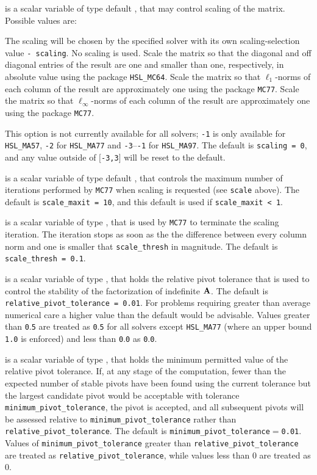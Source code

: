 \documentclass{galahad}
\begin{document}
\begin{description}
 is a scalar variable of type default \integer, that may control
scaling of the matrix.
Possible values are:
\begin{description}
 The scaling will be chosen by the specified solver with its
        own scaling-selection value {\tt - scaling}.
 No scaling is used.
 Scale the matrix so that the diagonal and off diagonal
entries of the result are one and smaller than one, respectively,
in absolute value using the package {\tt HSL\_MC64}.
 Scale the matrix so that $\ell_1$-norms of each column
of the result are approximately one using the package {\tt MC77}.
 Scale the matrix so that $\ell_{\infty}$-norms of each column
of the result are approximately one using the package {\tt MC77}.
\end{description}
This option is not currently available for all solvers; {\tt -1} is
only available for {\tt HSL\_MA57}, {\tt -2} for {\tt HSL\_MA77}
and {\tt -3}--{\tt -1} for {\tt HSL\_MA97}.
The default is {\tt scaling = 0},
and any value outside of $[${\tt -3,3}$]$ will be reset to the default.

 is a scalar variable of type default \integer,
that controls the maximum number of iterations performed
by {\tt MC77} when scaling is requested (see {\tt scale} above).
The default is {\tt scale\_maxit = 10},
and this default is used if {\tt scale\_maxit < 1}.

 is a scalar variable of type \realdp,
that is used by {\tt MC77} to terminate the scaling iteration.
The iteration stops as soon as the the difference between
every column norm and one is smaller that {\tt scale\_thresh}
in magnitude. The default is {\tt scale\_thresh = 0.1}.

 is a scalar variable of type \realdp,
that holds the relative pivot tolerance that is used to control the
stability of the factorization of indefinite ${\mathbf{A}}$.
The default is {\tt relative\_pivot\_tolerance = 0.01}.
For problems requiring greater
than average numerical care a higher value than the default would be
advisable. Values greater than {\tt 0}.{\tt 5} are treated as {\tt 0}.{\tt 5}
for all solvers except {\tt HSL\_MA77} (where an upper bound {\tt 1.0} is
enforced) and less than {\tt 0}.{\tt 0} as {\tt 0}.{\tt 0}.

 is a scalar variable of type \realdp,
that holds the minimum permitted value of the relative pivot tolerance.
If, at any stage of the computation, fewer than the
expected number of stable pivots have been found using
the current tolerance but the largest
candidate pivot would be acceptable with tolerance
{\tt minimum\_pivot\_tolerance}, the pivot is accepted, and all
subsequent pivots will be assessed relative to
{\tt minimum\_pivot\_tolerance} rather than
{\tt relative\_pivot\_tolerance}.
The default is {\tt minimum\_pivot\_tolerance$=$0.01}.
Values of {\tt minimum\_pivot\_tolerance} greater than
{\tt relative\_pivot\_\-tolerance} are treated as
{\tt relative\_pivot\_tolerance}, while  values
less than $0$ are treated as $0$.


\end{description}
\end{document}
